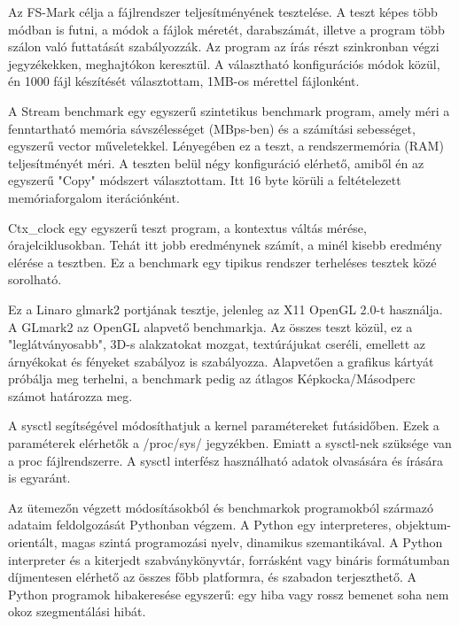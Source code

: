 Az FS-Mark célja a fájlrendszer teljesítményének tesztelése.
A teszt képes több módban is futni, a módok a fájlok méretét, darabszámát, illetve a program több szálon való futtatását szabályozzák. 
Az program az írás részt szinkronban végzi jegyzékekken, meghajtókon keresztül.
A választható konfigurációs módok közül, én 1000 fájl készítését választottam, 1MB-os mérettel fájlonként.

A Stream benchmark egy egyszerű szintetikus benchmark program, amely méri a fenntartható memória sávszélességet (MBps-ben) és a számítási sebességet, egyszerű vector műveletekkel.
Lényegében ez a teszt, a rendszermemória (RAM) teljesítményét méri.
A teszten belül négy konfiguráció elérhető, amiből én az egyszerű  "Copy" módszert választottam.
Itt 16 byte körüli a feltételezett memóriaforgalom iterációnként.

Ctx\_clock egy egyszerű teszt program, a kontextus váltás mérése, órajelciklusokban.
Tehát itt jobb eredménynek számít, a minél kisebb eredmény elérése a tesztben.
Ez a benchmark egy tipikus rendszer terheléses tesztek közé sorolható.

Ez a Linaro glmark2 portjának tesztje, jelenleg az X11 OpenGL 2.0-t használja. A GLmark2 az OpenGL alapvető benchmarkja. Az összes teszt közül, ez a "leglátványosabb", 3D-s alakzatokat mozgat, textúrájukat cseréli, emellett az árnyékokat és fényeket szabályoz is szabályozza.
Alapvetően a grafikus kártyát próbálja meg terhelni, a benchmark pedig az átlagos Képkocka/Másodperc számot határozza meg.

A sysctl segítségével módosíthatjuk a kernel paramétereket futásidőben. Ezek a paraméterek elérhetők a /proc/sys/ jegyzékben. Emiatt a sysctl-nek szüksége van a proc fájlrendszerre. A sysctl interfész használható adatok olvasására és írására is egyaránt.

Az ütemezőn végzett módosításokból és benchmarkok programokból származó adataim feldolgozását Pythonban végzem.
A Python egy interpreteres, objektum-orientált, magas szintá programozási nyelv, dinamikus szemantikával.
A Python interpreter és a kiterjedt szabványkönyvtár, forrásként vagy bináris formátumban díjmentesen elérhető az összes főbb platformra, és szabadon terjeszthető.
A Python programok hibakeresése egyszerű: egy hiba vagy rossz bemenet soha nem okoz szegmentálási hibát.

